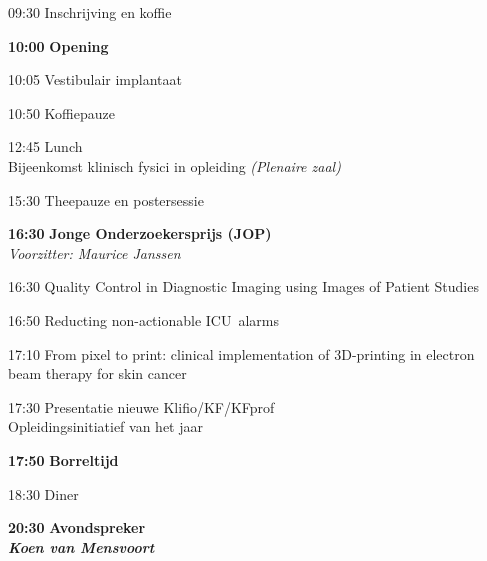 \documentclass[a4paper,10pt]{report}
\begin{document}
\begin{multicols*}{3}

\begin{packed_enum}
    \item[09:30] Inschrijving en koffie
        \vfill
    \item[\textbf{10:00}] \textbf{Opening}
        \vfill
    \item[10:05] Vestibulair implantaat
        \vfill
    \item[10:50] Koffiepauze
        \vfill
    \item[{\color{Blue}{\textbf{11:20}}}]{ }
        \vfill
    \item[12:45] Lunch\\
        {\small Bijeenkomst klinisch fysici in opleiding \hfill\textit{(Plenaire zaal)}}
        \vfill
    \item[{\color{Blue}{\textbf{14:00}}}]{ }
        \vfill
    \item[15:30] Theepauze en postersessie 
        \vfill
    \item[\textbf{16:30}] {\textbf{Jonge Onderzoekersprijs (JOP)}}\\\textit{Voorzitter: Maurice Janssen}
    \item[16:30] Quality Control in Diagnostic Imaging using Images of Patient Studies
    \item[16:50] Reducting non-actionable ICU alarms
    \item[17:10] From pixel to print: clinical implementation of 3D-printing in electron beam therapy for skin cancer
        \vfill
    \item[17:30] Presentatie nieuwe Klifio/KF/KFprof\\Opleidingsinitiatief van het jaar
        \vfill
    \item[\textbf{17:50}] {\textbf{Borreltijd}}
        \vfill
    \item[18:30] Diner
        \vfill
    \item[\textbf{20:30}] {\textbf{Avondspreker}}\\\textbf{\textit{Koen van Mensvoort}}
    \end{packed_enum}%


\end{multicols*}
\end{document}
